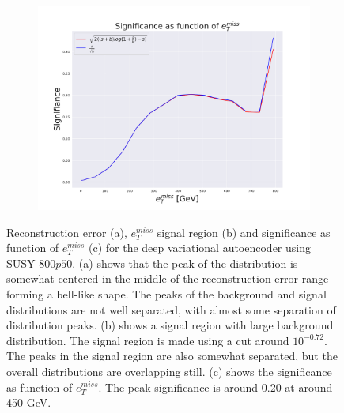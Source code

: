 \begin{figure}[H]
    \begin{subfigure}{.49\textwidth}
        \includegraphics[width=\textwidth]{Figures/VAE_testing/big/2lep/significance_etmiss_800p0p050_-0.7232197345309495.pdf}
        \caption{}
        \label{fig:VAE_2lep_big_signi_800}
    \end{subfigure}
    \hfill      
    \caption[2lep deep network | $800p50$ | VAE]{Reconstruction error (a), $e_T^{miss}$ signal region (b) and significance as function of 
    $e_T^{miss}$ (c) for the deep variational autoencoder using SUSY $800p50$.
    (a) shows that the peak of the distribution is somewhat centered in the middle 
    of the reconstruction error range forming a bell-like shape. The peaks of the background and signal 
    distributions are not well separated, with almost some separation of distribution peaks. (b) 
    shows a signal region with large background distribution. The signal region is made using a cut around
    $10^{-0.72}$. The peaks in the signal region are also somewhat 
    separated, but the overall distributions are overlapping still. 
    (c) shows the significance as function of $e_T^{miss}$.
The peak significance is around 0.20 at around 450 GeV.}
    \label{fig:VAE_2lep_big_rec_sig_signi_800}
\end{figure}

